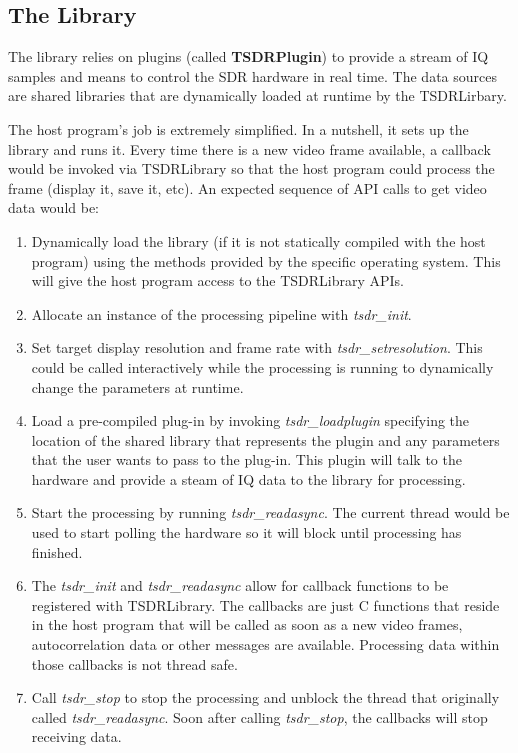 \documentclass[a4paper,12pt,twoside,openright]{report}
\begin{document}
\subsection{The Library}

The library relies on plugins (called \textbf{TSDRPlugin}) to provide a stream of IQ samples and means to control the SDR hardware in real time. The data sources are shared libraries that are dynamically loaded at runtime by the TSDRLirbary.

The host program's job is extremely simplified. In a nutshell, it sets up the library and runs it. Every time there is a new video frame available, a callback would be invoked via TSDRLibrary so that the host program could process the frame (display it, save it, etc). An expected sequence of API calls to get video data would be:

\begin{enumerate}
	\item Dynamically load the library (if it is not statically compiled with the host program) using the methods provided by the specific operating system. This will give the host program access to the TSDRLibrary APIs.
	\item Allocate an instance of the processing pipeline with \textit{tsdr\_init}.
	\item Set target display resolution and frame rate with \textit{tsdr\_setresolution}. This could be called interactively while the processing is running to dynamically change the parameters at runtime.
	\item Load a pre-compiled plug-in by invoking \textit{tsdr\_loadplugin} specifying the location of the shared library that represents the plugin and any parameters that the user wants to pass to the plug-in. This plugin will talk to the hardware and provide a steam of IQ data to the library for processing.
	\item Start the processing by running \textit{tsdr\_readasync}. The current thread would be used to start polling the hardware so it will block until processing has finished.
	\item The \textit{tsdr\_init} and \textit{tsdr\_readasync} allow for callback functions to be registered with TSDRLibrary. The callbacks are just C functions that reside in the host program that will be called as soon as a new video frames, autocorrelation data or other messages are available. Processing data within those callbacks is not thread safe.
	\item Call \textit{tsdr\_stop} to stop the processing and unblock the thread that originally called \textit{tsdr\_readasync}. Soon after calling \textit{tsdr\_stop}, the callbacks will stop receiving data.
\end{enumerate}
\end{document}
